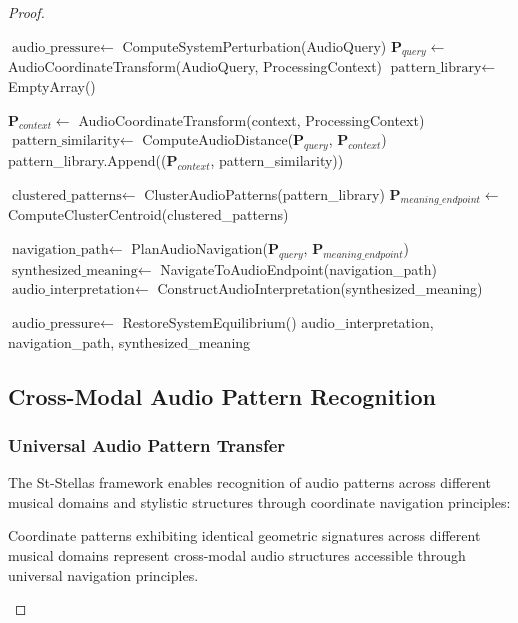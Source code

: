 \begin{proof}
\begin{definition}
\begin{algorithm}[H]
\caption{Empty Dictionary Audio Synthesis}
\begin{algorithmic}[1]
    \State $\text{audio\_pressure} \gets$ ComputeSystemPerturbation(AudioQuery)
    \State $\mathbf{P}_{query} \gets$ AudioCoordinateTransform(AudioQuery, ProcessingContext)
    \State $\text{pattern\_library} \gets$ EmptyArray()
    
        \State $\mathbf{P}_{context} \gets$ AudioCoordinateTransform(context, ProcessingContext)
        \State $\text{pattern\_similarity} \gets$ ComputeAudioDistance($\mathbf{P}_{query}$, $\mathbf{P}_{context}$)
        \State pattern\_library.Append(($\mathbf{P}_{context}$, pattern\_similarity))
    \EndFor
    
    \State $\text{clustered\_patterns} \gets$ ClusterAudioPatterns(pattern\_library)
    \State $\mathbf{P}_{meaning\_endpoint} \gets$ ComputeClusterCentroid(clustered\_patterns)
    
    \State $\text{navigation\_path} \gets$ PlanAudioNavigation($\mathbf{P}_{query}$, $\mathbf{P}_{meaning\_endpoint}$)
    \State $\text{synthesized\_meaning} \gets$ NavigateToAudioEndpoint(navigation\_path)
    \State $\text{audio\_interpretation} \gets$ ConstructAudioInterpretation(synthesized\_meaning)
    
    \State $\text{audio\_pressure} \gets$ RestoreSystemEquilibrium()
    \State \Return audio\_interpretation, navigation\_path, synthesized\_meaning
\EndProcedure
\end{algorithmic}
\end{algorithm}

\subsection{Cross-Modal Audio Pattern Recognition}

\subsubsection{Universal Audio Pattern Transfer}

The St-Stellas framework enables recognition of audio patterns across different musical domains and stylistic structures through coordinate navigation principles:

\begin{definition}
Coordinate patterns exhibiting identical geometric signatures across different musical domains represent cross-modal audio structures accessible through universal navigation principles.
\end{definition}


\end{definition}
\end{proof}
